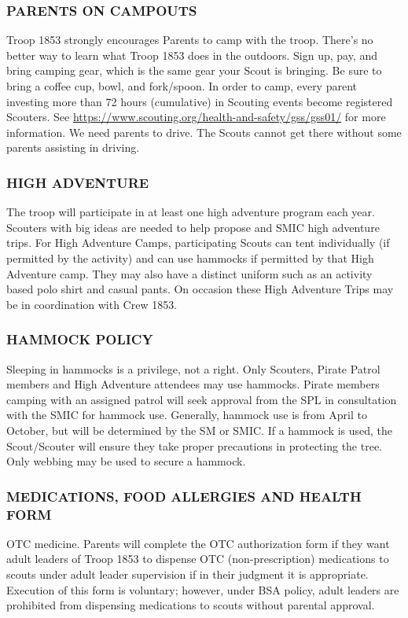 \documentclass{ltxguide}
\begin{document}
\subsubsection{PARENTS ON CAMPOUTS}
Troop 1853 strongly encourages Parents to camp with the troop. There's no better way to learn what Troop 1853 does in the outdoors. Sign up, pay, and bring camping gear, which is the same gear your Scout is bringing. Be sure to bring a coffee cup, bowl, and fork/spoon. In order to camp, every parent investing more than 72 hours (cumulative) in Scouting events become registered Scouters. See \url{https://www.scouting.org/health-and-safety/gss/gss01/} for more information. We need parents to drive. The Scouts cannot get there without some parents assisting in driving.

\subsubsection{HIGH ADVENTURE}
The troop will participate in at least one high adventure program each year. Scouters with big ideas are needed to help propose and SMIC high adventure trips. For High Adventure Camps, participating Scouts can tent individually (if permitted by the activity) and can use hammocks if permitted by that High Adventure camp. They may also have a distinct uniform such as an activity based polo shirt and casual pants. On occasion these High Adventure Trips may be in coordination with Crew 1853.

\subsubsection{HAMMOCK POLICY}
Sleeping in hammocks is a privilege, not a right. Only Scouters, Pirate Patrol members and High Adventure attendees may use hammocks. Pirate members camping with an assigned patrol will seek approval from the \ac{SPL} in consultation with the SMIC for hammock use. Generally, hammock use is from April to October, but will be determined by the SM or SMIC. If a hammock is used, the Scout/Scouter will ensure they take proper precautions in protecting the tree. Only webbing may be used to secure a hammock.

\subsubsection{MEDICATIONS, FOOD ALLERGIES AND HEALTH FORM}
\ac{OTC} medicine. Parents will complete the OTC authorization form if they want adult leaders of Troop 1853 to dispense \ac{OTC} (non-prescription) medications to scouts under adult leader supervision if in their judgment it is appropriate. Execution of this form is voluntary; however, under \ac{BSA} policy, adult leaders are prohibited from dispensing medications to scouts without parental approval.
\end{document}
